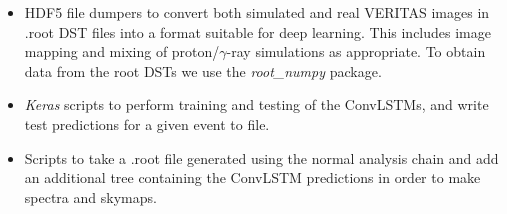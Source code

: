 \begin{itemize}
    \item HDF5 file dumpers to convert both simulated and real VERITAS images in .root DST files into a format suitable for deep learning. This includes image mapping and mixing of proton/$\gamma$-ray simulations as appropriate. To obtain data from the root DSTs we use the \textit{root\_numpy} \cite{rootnumpy} package.
    \item \textit{Keras} scripts to perform training and testing of the ConvLSTMs, and write test predictions for a given event to file.
    \item Scripts to take a .root file generated using the normal analysis chain and add an additional tree containing the ConvLSTM predictions in order to make spectra and skymaps.
\end{itemize}


